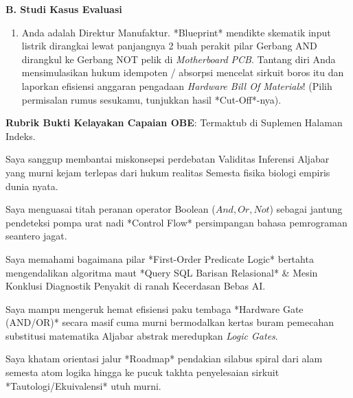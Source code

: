 \documentclass[../main]{subfiles}
\begin{document}
\begin{asesmen}
\textbf{B. Studi Kasus Evaluasi}

\begin{enumerate}
  \item Anda adalah Direktur Manufaktur. *Blueprint* mendikte skematik input listrik dirangkai lewat panjangnya 2 buah perakit pilar Gerbang AND dirangkul ke Gerbang NOT pelik di \textit{Motherboard PCB}. Tantang diri Anda mensimulasikan hukum idempoten / absorpsi mencelat sirkuit boros itu dan laporkan efisiensi anggaran pengadaan \textit{Hardware Bill Of Materials}! (Pilih permisalan rumus sesukamu, tunjukkan hasil *Cut-Off*-nya).
\end{enumerate}

\textbf{Rubrik Bukti Kelayakan Capaian OBE}: Termaktub di Suplemen Halaman Indeks.
\end{asesmen}


\begin{checklist}
  \item Saya sanggup membantai miskonsepsi perdebatan Validitas Inferensi Aljabar yang murni kejam terlepas dari hukum realitas Semesta fisika biologi empiris dunia nyata.
  \item Saya menguasai titah peranan operator Boolean ($And, Or, Not$) sebagai jantung pendeteksi pompa urat nadi *Control Flow* persimpangan bahasa pemrograman seantero jagat.
  \item Saya memahami bagaimana pilar *First-Order Predicate Logic* bertahta mengendalikan algoritma maut *Query SQL Barisan Relasional* \& Mesin Konklusi Diagnostik Penyakit di ranah Kecerdasan Bebas AI.
  \item Saya mampu mengeruk hemat efisiensi paku tembaga *Hardware Gate (AND/OR)* secara masif cuma murni bermodalkan kertas buram pemecahan substitusi matematika Aljabar abstrak meredupkan \textit{Logic Gates}.
  \item Saya khatam orientasi jalur *Roadmap* pendakian silabus spiral dari alam semesta atom logika hingga ke pucuk takhta penyelesaian sirkuit *Tautologi/Ekuivalensi* utuh murni.
\end{checklist}

\end{document}
